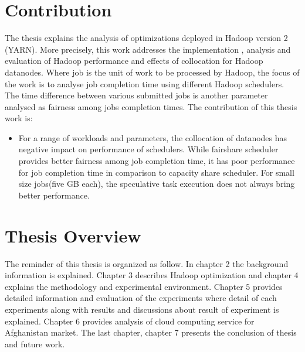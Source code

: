 \section{Contribution}

The thesis explains the analysis of optimizations deployed in Hadoop version 2 (YARN). More precisely, this work addresses the implementation , analysis and evaluation of Hadoop performance and effects of collocation for Hadoop datanodes. Where job is the unit of work to be processed by Hadoop, the focus of the work is to analyse job completion time using different Hadoop schedulers. The time difference between various submitted jobs is another parameter analysed as fairness among jobs completion times. The contribution of this thesis work is:
\begin{itemize}
 \item{ For a range of workloads and parameters,  the collocation of datanodes has negative impact on performance of schedulers. While fairshare scheduler provides better fairness among job completion time, it has poor performance for job completion time in comparison to capacity share scheduler. For small size jobs(five GB each), the speculative task execution does not always bring better performance.  }   
\end{itemize} 



\section{Thesis Overview}

The reminder of this thesis is organized as follow. In chapter 2 the background information is explained. Chapter 3 describes Hadoop optimization and chapter 4 explains the methodology and experimental environment. Chapter 5 provides detailed information and evaluation of the experiments where detail of each experiments along with results and discussions about result of experiment is explained. Chapter 6 provides analysis of cloud computing service for Afghanistan market. The last chapter, chapter 7 presents the conclusion of thesis and future work. 
